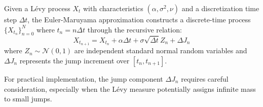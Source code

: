 \begin{definition}
    Given a Lévy process $X_t$ with characteristics $(\alpha, \sigma^2, \nu)$ and a discretization time step $\Delta t$, the Euler-Maruyama approximation constructs a discrete-time process $\{X_{t_n}\}_{n=0}^N$ where $t_n = n\Delta t$ through the recursive relation:
    \begin{equation}
        X_{t_{n+1}} = X_{t_n} + \alpha \Delta t + \sigma\sqrt{\Delta t}Z_n + \Delta J_n
    \end{equation}
    where $Z_n \sim \mathcal{N}(0,1)$ are independent standard normal random variables and $\Delta J_n$ represents the jump increment over $[t_n, t_{n+1}]$.
\end{definition}
\iffalse
    For practical implementation, the jump component $\Delta J_n$ requires careful consideration, especially when the Lévy measure potentially assigns infinite mass to small jumps.

